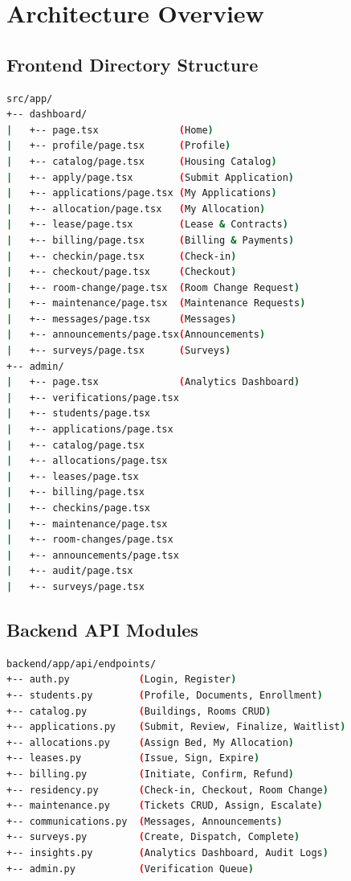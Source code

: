 \documentclass[12pt,a4paper]{article}
\begin{document}
\section{Architecture Overview}

\subsection{Frontend Directory Structure}

\begin{lstlisting}[language=bash, caption={Frontend page tree}]
src/app/
+-- dashboard/
|   +-- page.tsx              (Home)
|   +-- profile/page.tsx      (Profile)
|   +-- catalog/page.tsx      (Housing Catalog)
|   +-- apply/page.tsx        (Submit Application)
|   +-- applications/page.tsx (My Applications)
|   +-- allocation/page.tsx   (My Allocation)
|   +-- lease/page.tsx        (Lease & Contracts)
|   +-- billing/page.tsx      (Billing & Payments)
|   +-- checkin/page.tsx      (Check-in)
|   +-- checkout/page.tsx     (Checkout)
|   +-- room-change/page.tsx  (Room Change Request)
|   +-- maintenance/page.tsx  (Maintenance Requests)
|   +-- messages/page.tsx     (Messages)
|   +-- announcements/page.tsx(Announcements)
|   +-- surveys/page.tsx      (Surveys)
+-- admin/
|   +-- page.tsx              (Analytics Dashboard)
|   +-- verifications/page.tsx
|   +-- students/page.tsx
|   +-- applications/page.tsx
|   +-- catalog/page.tsx
|   +-- allocations/page.tsx
|   +-- leases/page.tsx
|   +-- billing/page.tsx
|   +-- checkins/page.tsx
|   +-- maintenance/page.tsx
|   +-- room-changes/page.tsx
|   +-- announcements/page.tsx
|   +-- audit/page.tsx
|   +-- surveys/page.tsx
\end{lstlisting}

\subsection{Backend API Modules}

\begin{lstlisting}[language=bash, caption={Backend endpoint modules}]
backend/app/api/endpoints/
+-- auth.py            (Login, Register)
+-- students.py        (Profile, Documents, Enrollment)
+-- catalog.py         (Buildings, Rooms CRUD)
+-- applications.py    (Submit, Review, Finalize, Waitlist)
+-- allocations.py     (Assign Bed, My Allocation)
+-- leases.py          (Issue, Sign, Expire)
+-- billing.py         (Initiate, Confirm, Refund)
+-- residency.py       (Check-in, Checkout, Room Change)
+-- maintenance.py     (Tickets CRUD, Assign, Escalate)
+-- communications.py  (Messages, Announcements)
+-- surveys.py         (Create, Dispatch, Complete)
+-- insights.py        (Analytics Dashboard, Audit Logs)
+-- admin.py           (Verification Queue)
\end{lstlisting}
\end{document}
